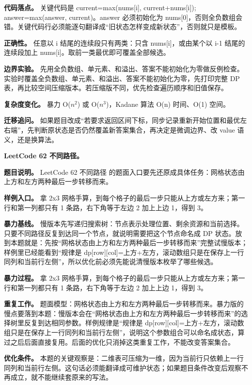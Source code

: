 \textbf{代码落点。} 关键代码是 current=max(nums[i], current+nums[i]); answer=max(answer, current)。answer 必须初始化为 nums[0]，否则全负数组会错。关键代码行必须能逐句翻译成“旧状态怎样变成新状态”，否则就只是模板。

\textbf{正确性。} 任意以 i 结尾的连续段只有两类：只含 nums[i]，或由某个以 i-1 结尾的连续段加上 nums[i]。取前一类最优即可覆盖全部候选。

\textbf{边界实验。} 先用全负数组、单元素、和溢出、答案不能初始化为零做反例检查。实验时覆盖全负数组、单元素、和溢出、答案不能初始化为零，先打印完整 DP 表，再比较空间压缩版本。若压缩版不同，优先检查遍历顺序和旧值保存。

\textbf{复杂度变化。} 暴力 O(\ensuremath{n^{2}}) 或 O(\ensuremath{n^{3}})，Kadane 算法 O(n) 时间、O(1) 空间。

\textbf{迁移追问。} 如果题目改成“若要求返回区间下标，同步记录重新开始位置和最优左右端”，先判断原状态是否仍然覆盖新答案集合，再决定是微调边界、改 value 语义，还是换算法。

\noindent\textbf{LeetCode 62 不同路径。}

\textbf{题目说明。} LeetCode 62 不同路径 的题面入口要先还原成具体任务：网格状态由上方和左方两种最后一步转移而来。

\textbf{样例入口。} 拿 2x3 网格手算，到每个格子的最后一步只能从上方或左方来；第一行和第一列都只有 1 条路，右下角等于左边 2 加上上边 1，得到 3。

\textbf{暴力基线。} 慢版本先写递归搜索树：节点表示处理位置、剩余资源和当前选择。只要不同路径反复到达同一个节点，就说明需要把这个节点命名成 DP 状态。放到本题就是：先按“网格状态由上方和左方两种最后一步转移而来”完整试慢版本；样例里已经能看到“规律是 dp[row][col]=上方+左方，滚动数组只是在保存上一行同列和当前行左侧”，所以优化前必须先能说清慢版本枚举了哪些候选。

\textbf{暴力过程。} 拿 2x3 网格手算，到每个格子的最后一步只能从上方或左方来；第一行和第一列都只有 1 条路，右下角等于左边 2 加上上边 1，得到 3。

\textbf{重复工作。} 题面模型：网格状态由上方和左方两种最后一步转移而来。暴力版的慢点要落到本题：慢版本会在“网格状态由上方和左方两种最后一步转移而来”的选择树里反复到达相同参数。样例规律是“规律是 dp[row][col]=上方+左方，滚动数组只是在保存上一行同列和当前行左侧”，说明这个参数组合可以命名成状态，算过之后后面直接复用。后面的优化只消掉这类重复工作，不能改变答案集合。

\textbf{优化条件。} 本题的关键观察是：二维表可压缩为一维，因为当前行只依赖上一行同列和当前行左侧。这句话必须能翻译成可维护状态；如果题目条件改变后观察不再成立，就不能继续套原来的写法。


